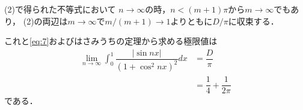 \documentclass[../../main.tex]{subfiles}
\begin{document}
(2)で得られた不等式において
$n\to\infty$の時，$n < (m+1)\pi$から$m\to\infty$でもあり，
(2)の両辺は$m\to\infty$で$m/(m+1)\to1$よりともに$D/\pi$に収束する．

これと\cref{eq:7}およびはさみうちの定理から求める極限値は
\begin{align}
  \lim_{n\to\infty}\int_0^1\dfrac{|\sin nx|}{(1+\cos^2nx)^2}dx
  &=\dfrac{D}{\pi} \\
  &= \dfrac{1}{4}+\dfrac{1}{2\pi}
\end{align}
である．

\newpage
\end{document}
